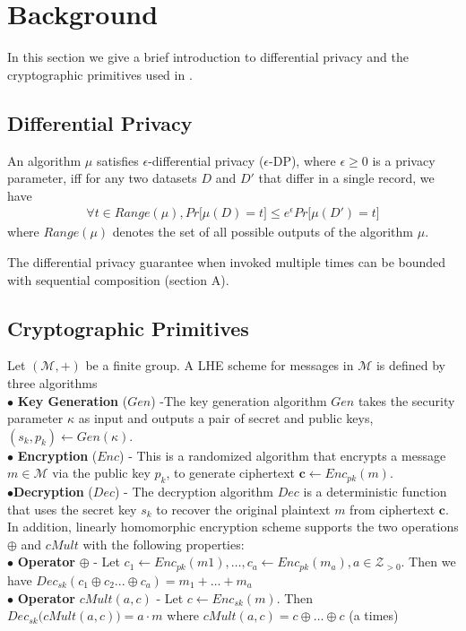 
\section{Background}
In this section we give a brief introduction to differential privacy and the cryptographic primitives used in \system. 

\subsection{Differential Privacy}
\begin{definition} An algorithm $\mu$
satisfies $\epsilon$-differential privacy ($\epsilon$-DP), where $\epsilon \geq 0$ is a privacy parameter, iff
 for any two datasets $D$ and $D'$ that differ in a single record, we have
\begin{gather}
\forall t \in Range(\mu), Pr \big[\mu(D) = t\big] \leq e^{\epsilon}Pr\big[\mu(D') = t\big]
\end{gather}
where $Range(\mu)$ denotes the set of all possible outputs
of the algorithm $\mu$.
\end{definition} 
The differential privacy guarantee  when
invoked multiple times can
be bounded with sequential composition (section A).

\subsection{Cryptographic Primitives}
Let $(\mathcal{M}, +)$ be a finite group. A \textsf{LHE} scheme
for messages in $\mathcal{M}$ is defined  by three algorithms \\
$\bullet$ \textbf{Key Generation }($Gen$) -The key generation algorithm $Gen$ takes the security parameter $\kappa$ as input and outputs
a pair of secret and public keys, $(s_k, p_k) \leftarrow Gen(\kappa)$.\\
$\bullet$ \textbf{Encryption} ($Enc$) - This is a randomized algorithm that encrypts a message $m \in \mathcal{M}$ via the public key $p_k$, to generate ciphertext $\mathbf{c} \leftarrow Enc_{pk}(m)$.\\
$\bullet$\textbf{Decryption} ($Dec$) - The decryption algorithm $Dec$ is a deterministic function that uses the secret key $s_k$ to
recover the original plaintext $m$ from ciphertext $\mathbf{c}$.
\\
In addition, linearly homomorphic encryption scheme supports the two operations $\oplus$ and $cMult$ with the following properties:
\\$\bullet$ \textbf{Operator} $\oplus$ - Let $c_1 \leftarrow Enc_{pk}(m1), \ldots, c_a \leftarrow Enc_{pk}(m_a), a \in \mathcal{Z}_{>0}$. Then we have  $Dec_{sk}(c_1\oplus c_2 ...\oplus c_a)=    m_1 + \ldots   + m_a$  \\
$\bullet$ \textbf{Operator} $cMult(a,c)$ - Let $c\leftarrow  Enc_{sk}(m)$. Then  \\ $Dec_{sk}\big(cMult(a,c)\big)=a\cdot m$ where $cMult(a,c)=c\oplus \ldots \oplus c$ (a times) 


